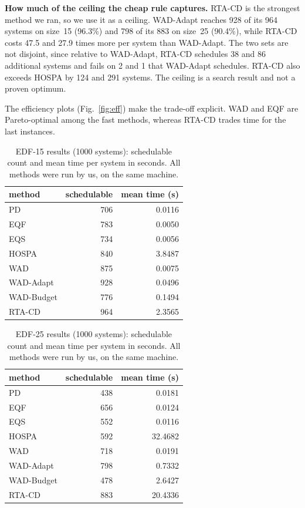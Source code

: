 \documentclass[conference]{IEEEtran}
\begin{document}
\smallskip\noindent\textbf{How much of the ceiling the cheap rule captures.}
RTA-CD is the strongest method we ran, so we use it as a ceiling. WAD-Adapt
reaches 928 of its 964 systems on size~15 (96.3\%) and 798 of its 883 on size~25
(90.4\%), while RTA-CD costs 47.5 and 27.9 times more per system than WAD-Adapt.
The two sets are not disjoint, since relative to WAD-Adapt, RTA-CD schedules 38
and 86 additional systems and fails on 2 and 1 that WAD-Adapt schedules. RTA-CD
also exceeds HOSPA by 124 and 291 systems. The ceiling is a search result and not
a proven optimum.

The efficiency plots (Fig.~\ref{fig:eff}) make the trade-off explicit. WAD and EQF
are Pareto-optimal among the fast methods, whereas RTA-CD trades time for the last
instances.

\begin{table}[t]
\centering
\caption{EDF-15 results (1000 systems): schedulable count and mean time per
system in seconds. All methods were run by us, on the same machine.}
\label{tab:main}
\begin{tabular}{lrr}
\toprule
method & schedulable & mean time (s) \\
\midrule
PD                 & 706 & 0.0116 \\
EQF                & 783 & 0.0050 \\
EQS                & 734 & 0.0056 \\
HOSPA              & 840 & 3.8487 \\
\midrule
WAD                & 875 & 0.0075 \\
WAD-Adapt          & 928 & 0.0496 \\
WAD-Budget         & 776 & 0.1494 \\
RTA-CD             & 964 & 2.3565 \\
\bottomrule
\end{tabular}
\end{table}

\begin{table}[t]
\centering
\caption{EDF-25 results (1000 systems): schedulable count and mean time per
system in seconds. All methods were run by us, on the same machine.}
\label{tab:25}
\begin{tabular}{lrr}
\toprule
method & schedulable & mean time (s) \\
\midrule
PD                 & 438 & 0.0181 \\
EQF                & 656 & 0.0124 \\
EQS                & 552 & 0.0116 \\
HOSPA              & 592 & 32.4682 \\
\midrule
WAD                & 718 & 0.0191 \\
WAD-Adapt          & 798 & 0.7332 \\
WAD-Budget         & 478 & 2.6427 \\
RTA-CD             & 883 & 20.4336 \\
\bottomrule
\end{tabular}
\end{table}
\end{document}
